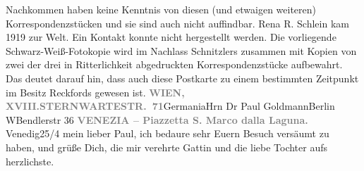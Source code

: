 {                                 Nachkommen haben keine Kenntnis von diesen (und etwaigen weiteren)
                                 Korrespondenzstücken und sie sind auch nicht auffindbar. Rena R. Schlein kam
                                    1919 zur Welt. Ein Kontakt konnte nicht hergestellt
                                 werden. Die vorliegende Schwarz-Weiß-Fotokopie wird im Nachlass Schnitzlers zusammen mit
                                 Kopien von zwei der drei in Ritterlichkeit abgedruckten Korrespondenzstücke
                                 aufbewahrt. Das deutet darauf hin, dass auch diese Postkarte zu
                                 einem bestimmten Zeitpunkt im Besitz Reckfords gewesen ist. }\toendnotes[C]{\smallbreak}\pstart{}{\pb}\label{T_L02687-1v}\label{T_L02687-1}\pend{}\pstart{}\textcolor{gray}{\textbf{WIEN, XVIII.}}\pend{}\pstart{}\textcolor{gray}{\textbf{STERNWARTESTR. 71}}\pend{}{\bigskip}\pstart{}{\pb}Germania\pend{}\pstart{}Hrn Dr Paul Goldmann\pend{}\pstart{}Berlin W\pend{}\pstart{}Bendlerstr 36\pend{}{\bigskip}
\pstart
           \noindent{}\centering{}{\pb}\textcolor{gray}{\textbf{VENEZIA – Piazzetta S. Marco dalla
                  Laguna.}}\pend
           \vspace{1em}
\pstart
           \raggedleft{}{\pb}Venedig25/4\pend
           \vspace{0.5em}
\pstart
           mein lieber Paul, ich bedaure sehr Euern Besuch versäumt zu haben,
               und grüße Dich, die mir verehrte Gattin und die liebe Tochter aufs herzlichste.\pend
           
